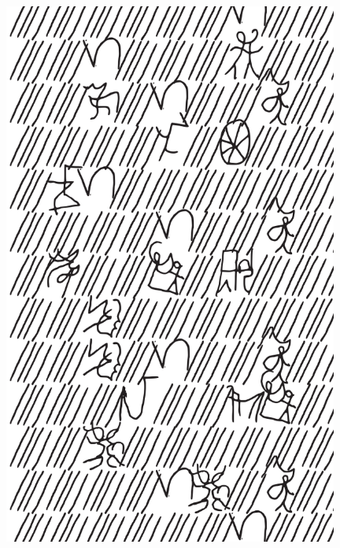 \makeatletter\@openrightfalse
\movetooddpage
\begin{absolutelynopagebreak}
\begin{vplace}
\begin{figure}[H]
\begin{adjustwidth}{-0.99cm}{}
  \centering
  \vspace*{-1.77cm}
  \includegraphics[width=110mm]{./imgs/img10.pdf}  
  \hfill
\end{adjustwidth}

\thispagestyle{empty}

\end{figure}
\end{vplace}

\end{absolutelynopagebreak}

